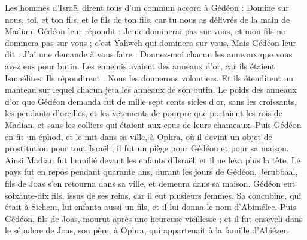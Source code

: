 \begin{multicols}{2}
Les hommes d'Israël dirent tous d'un commun accord à Gédéon : Domine sur nous, toi, et ton fils, et le fils de ton fils, car tu nous as délivrés de la main de Madian.
Gédéon leur répondit : Je ne dominerai pas sur vous, et mon fils ne dominera pas sur vous ; c'est Yahweh qui dominera sur vous.
Mais Gédéon leur dit : J’ai une demande à vous faire : Donnez-moi chacun les anneaux que vous avez eus pour butin. Les ennemis avaient des anneaux d'or, car ils étaient Ismaélites.
Ils répondirent : Nous les donnerons volontiers. Et ils étendirent un manteau sur lequel chacun jeta les anneaux de son butin.
Le poids des anneaux d'or que Gédéon demanda fut de mille sept cents sicles d'or, sans les croissants, les pendants d'oreilles, et les vêtements de pourpre que portaient les rois de Madian, et sans les colliers qui étaient aux cous de leurs chameaux.
Puis Gédéon en fit un  éphod, et le mit dans sa ville, à Ophra, où il devint un objet de prostitution pour tout Israël ; il fut un piège pour Gédéon et pour sa maison.
Ainsi Madian fut humilié devant les enfants d'Israël, et il ne leva plus la tête. Le pays fut en repos pendant quarante ans, durant les jours de Gédéon.
Jerubbaal, fils de Joas s’en retourna dans sa ville, et demeura dans sa maison.
Gédéon eut soixante-dix fils, issus de ses reins, car il eut plusieurs femmes.
Sa concubine, qui était à Sichem, lui enfanta aussi un fils, et il lui donna le nom d’Abimélec.
Puis Gédéon, fils de Joas, mourut après une heureuse vieillesse ; et il fut enseveli dans le sépulcre de Joas, son père, à Ophra, qui appartenait à la famille d’Abiézer.

\end{multicols}
